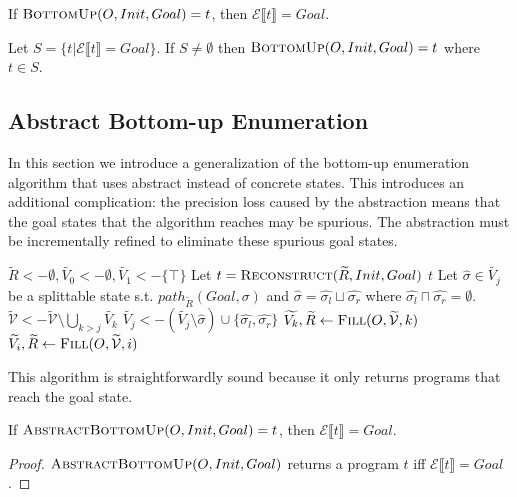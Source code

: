 \documentclass[review]{acmart}
\newcommand{\abs}[1]{\ensuremath{\widetilde{#1}}}
\renewcommand{\eval}[1]{\ensuremath{\mathcal{E}\llbracket#1\rrbracket}}
\begin{document}
\begin{theorem}[Soundness]
  If $\Call{BottomUp}{O, Init, Goal} = t$, then $\eval{t} = Goal$.
\end{theorem}

\begin{theorem}[Completeness]
  Let $S = \{t | \eval{t} = Goal\}$. If $S \neq \emptyset$ then
  $\Call{BottomUp}{O, Init, Goal} = t$ where $t \in S$.
\end{theorem}

\subsection{Abstract Bottom-up Enumeration}

In this section we introduce a generalization of the bottom-up enumeration
algorithm that uses abstract instead of concrete states. This introduces an
additional complication: the precision loss caused by the abstraction means that
the goal states that the algorithm reaches may be spurious. The abstraction must
be incrementally refined to eliminate these spurious goal states.

\begin{algorithm}
  \begin{algorithmic}[1]
    \State $\abs{R} <- \emptyset, \abs{V_0} <- \emptyset, \abs{V_1} <- \{\top\}$
    \While {$Goal \in \abs{\mathcal{V}}$}
    \State Let $t = \Call{Reconstruct}{\abs{R}, Init, Goal}$
    \If {$\eval{t} = Goal$}
    \State \Return $t$
    \EndIf
    \State Let $\hat{\sigma} \in \abs{V_j}$ be a splittable state s.t.
    $path_{\abs{R}}(Goal, \sigma)$ and $\hat{\sigma} = \hat{\sigma_l} \sqcup
    \hat{\sigma_r}$ where $\hat{\sigma_l} \sqcap \hat{\sigma_r} = \emptyset$.
    \State $\abs{\mathcal{V}} <- \abs{\mathcal{V}} \setminus \bigcup_{k > j} \abs{V_k}$
    \State $\abs{V_j} <- (\abs{V_j} \setminus \hat{\sigma}) \cup
    \{\hat{\sigma_l}, \hat{\sigma_r}\}$
    \State $\abs{V_k}, \abs{R} <- \Call{Fill}{O, \abs{\mathcal{V}}, k}$
    \EndFor
    \EndWhile
    \State $\abs{V_i}, \abs{R} <- \Call{Fill}{O, \abs{\mathcal{V}}, i}$
    \EndFor
    \EndFunction
  \end{algorithmic}
\end{algorithm}

This algorithm is straightforwardly sound because it only returns programs that
reach the goal state.
\begin{theorem}
  If $\Call{AbstractBottomUp}{O, Init, Goal} = t$, then $\eval{t} = Goal$.
\end{theorem}
\begin{proof}
  $\Call{AbstractBottomUp}{O, Init, Goal}$ returns a program $t$ iff $\eval{t} = Goal$.
\end{proof}
\end{document}
